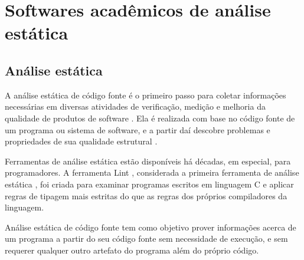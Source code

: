\section{Softwares acadêmicos de análise estática} \label{analise-estatica}

%
%
%

\subsection{Análise estática}

A análise estática de código fonte é o primeiro passo para coletar informações
necessárias em diversas atividades de verificação, medição e melhoria da
qualidade de produtos de software \cite{Cruz2009, Kirkov2010}. Ela é
realizada com base no código fonte de um programa ou sistema de software, e a
partir daí descobre problemas e propriedades de sua qualidade estrutural
\cite{Chess2007}.

Ferramentas de análise estática estão disponíveis há décadas, em especial,
para programadores. A ferramenta Lint \cite{Johnson1978}, considerada a
primeira ferramenta de análise estática \cite{Gosain2015}, foi criada para
examinar programas escritos em linguagem C e aplicar regras de tipagem mais
estritas do que as regras dos próprios compiladores da linguagem.

%

Análise estática de código fonte tem como objetivo prover
informações acerca de um programa a partir do seu código fonte sem
necessidade de execução, e sem requerer qualquer outro artefato do programa
além do próprio código.

